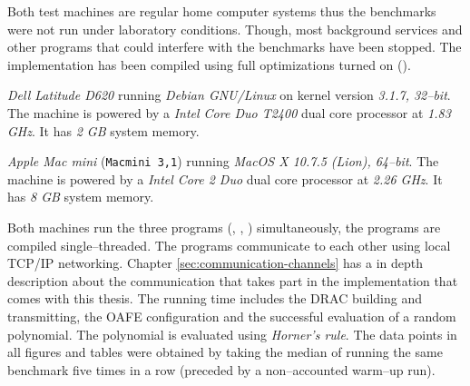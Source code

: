 \label{sec:evaluation}

%
%
\label{sec:test-setup}

\label{sec:test-machines}

Both test machines are regular home computer systems thus the benchmarks were
not run under laboratory conditions. Though, most background services and other
programs that could interfere with the benchmarks have been stopped. The
implementation has been compiled using full optimizations turned on
().



\emph{Dell Latitude D620} running \emph{Debian GNU/Linux} on kernel version
\emph{3.1.7, 32--bit}. The machine is powered by a \emph{Intel\TReg{} Core Duo
T2400} dual core processor at \emph{1.83 GHz}. It has \emph{2 GB} system memory.



\emph{Apple Mac mini} (\texttt{Macmini 3,1}) running \emph{MacOS X 10.7.5
(Lion), 64--bit}. The machine is powered by a \emph{Intel\TReg{} Core 2 Duo}
dual core processor at \emph{2.26 GHz}. It has \emph{8 GB} system memory.


Both machines run the three programs (\JWBpOne{}, \JWBpTwo{}, \JWBtoken{})
simultaneously, the programs are compiled single--threaded. The programs
communicate to each other using local TCP/IP networking. Chapter
\ref{sec:communication-channels} has a in depth description about the
communication that takes part in the implementation that comes with this thesis.
The running time includes the DRAC building and transmitting, the OAFE
configuration and the successful evaluation of a random polynomial. The
polynomial is evaluated using \emph{Horner's rule}\cite{cormen01}. The data
points in all figures and tables were obtained by taking the median of
running the same benchmark five times in a row (preceded by a non--accounted
warm--up run).


%
%
\label{sec:comp-complexity}

